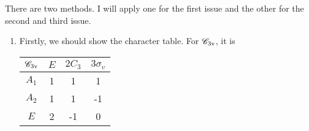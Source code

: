 \documentclass[a4paper]{book}
\begin{document}
	\begin{solution}

		There are two methods. I will apply one for the first issue and the other for the second and third issue.

		\begin{enumerate}[label=(\alph*)]
	
		\item Firstly, we should show the character table. For $\mathscr{C}_{\rm 3v}$, it is
		\begin{center}
		\begin{tabular}{cccc}\hline
	$\mathscr{C}_{\rm 3v}$ & $E$ & $2C_3$ & $3\sigma_v$ \\ \hline
			$A_1$	&	1	&	1	&	1	\\
			$A_2$	&	1	&	1	&	-1	\\
			$E$		&	2	&	-1	&	0	\\ \hline
		\end{tabular}
		\end{center}
		

\end{enumerate}
\end{solution}
\end{document}
